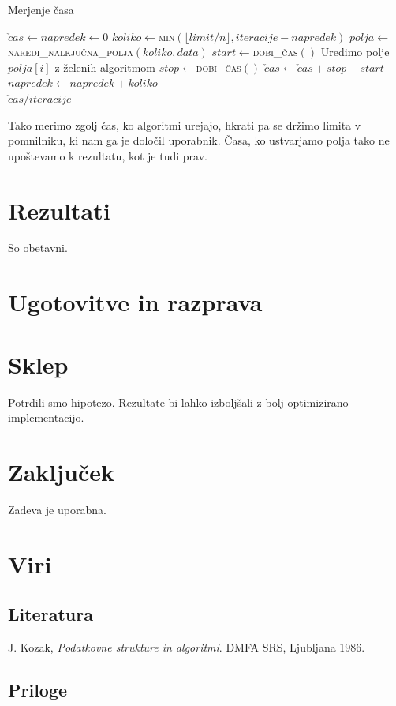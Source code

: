 \documentclass[a4paper,oneside,12pt]{article}
\begin{document}
\begin{algorithm}
  \caption{Merjenje časa}\label{algo:time}
  \begin{algorithmic}[1]
    \State \label{line:init} $\check{c}as \gets napredek \gets 0$
    \Repeat \label{line:repeattimestart}
      \State \label{line:koliko} $koliko \gets $\textsc{min}$(\lfloor limit / n \rfloor, iteracije - napredek)$
      \State \label{line:polja} $polja \gets $\textsc{naredi\_nalkjučna\_polja}$(koliko, data)$
      \State \label{line:getstarttime} $start \gets $\textsc{dobi\_čas}$()$
       \label{line:beginsortfor}
        \State Uredimo polje $polja[i]$ z želenih algoritmom
      \EndFor \label{line:endsortfor}
      \State \label{line:getendtime} $stop \gets $\textsc{dobi\_čas}$()$
      \State $\check{c}as \gets \check{c}as + stop - start$
      \State $napredek \gets napredek + koliko$
     \label{line:repeattimeend} \\
    \Return \label{line:returnaverage}$\check{c}as / iteracije$
  \end{algorithmic}
\end{algorithm}
Tako merimo zgolj čas, ko algoritmi urejajo, hkrati pa se držimo limita v pomnilniku, ki
nam ga je določil uporabnik. Časa, ko ustvarjamo polja tako ne upoštevamo k rezultatu, kot
je tudi prav.

\section{Rezultati}
So obetavni.
\section{Ugotovitve in razprava}
\section{Sklep}
Potrdili smo hipotezo. Rezultate bi lahko izboljšali z bolj optimizirano implementacijo.
\section{Zaključek}
Zadeva je uporabna.
\section{Viri}
\subsection{Literatura}
\vspace{-1cm}
\begin{thebibliography}{99}
   {J. Kozak, \emph{Podatkovne strukture in algoritmi}. DMFA SRS, Ljubljana 1986. }
\end{thebibliography}
\subsection{Priloge}
\end{document}
